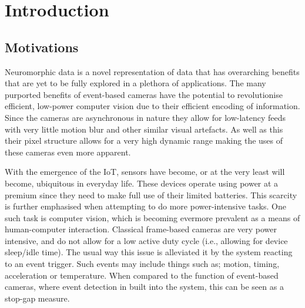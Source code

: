 \chapter{Introduction}

\section{Motivations}

Neuromorphic data is a novel representation of data that has overarching benefits that are yet to be fully explored in a plethora of applications. The many purported benefits of event-based cameras have the potential to revolutionise efficient, low-power computer vision due to their efficient encoding of information. Since the cameras are asynchronous in nature they allow for low-latency feeds with very little motion blur and other similar visual artefacts. As well as this their pixel structure allows for a very high dynamic range making the uses of these cameras even more apparent.

With the emergence of the IoT, sensors have become, or at the very least will become, ubiquitous in everyday life. These devices operate using power at a premium since they need to make full use of their limited batteries. This scarcity is further emphasised when attempting to do more power-intensive tasks. One such task is computer vision, which is becoming evermore prevalent as a means of human-computer interaction. Classical frame-based cameras are very power intensive, and do not allow for a low active duty cycle (i.e., allowing for device sleep/idle time). The usual way this issue is alleviated it by the system reacting to an event trigger. Such events may include things such as; motion, timing, acceleration or temperature. When compared to the function of event-based cameras, where event detection in built into the system, this can be seen as a stop-gap measure.

